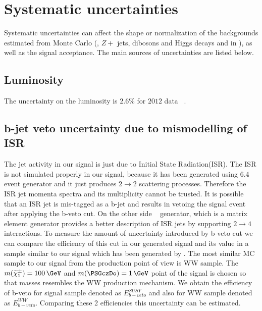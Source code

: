 \section{Systematic uncertainties}
\label{sect:sys}
Systematic uncertainties can affect the shape or normalization of the
backgrounds estimated from Monte Carlo (\ttbar, $Z+$ jets, dibosons and Higgs decays and \wjets in \tauTau \bintwo), 
as well as the signal acceptance. 
The main sources of uncertainties are listed below.
\subsection{Luminosity}
The uncertainty on the luminosity  is $2.6\%$ for $2012$ data ~\cite{LUMI}.

\subsection{b-jet veto uncertainty due to mismodelling of ISR}
The jet activity in our signal is just due to Initial State Radiation(ISR). The ISR is not simulated properly in our signal, because it has been generated using \PYTHIA $6.4$ event generator and it just produces $2 \rightarrow 2$ scattering processes. Therefore the ISR jet momenta spectra and its multiplicity cannot be trusted. It is possible that an ISR jet is mis-tagged as a b-jet and results in vetoing the signal event after applying the b-veto cut. On the other side \MADGRAPH ~\cite{MADGRAPH} generator, which is a matrix element generator provides a better description of ISR jets by supporting $2 \rightarrow 4$ interactions. To measure the amount of uncertainty introduced by b-veto cut we can compare the efficiency of this cut in our generated signal and its value in a sample similar to our signal which has been generated by \MADGRAPH. 
The most similar MC sample to our signal from the production point of view is WW sample. The $m(\chione) = 100\,\GeV$ and $m(\PSGczDo) = 1\,\GeV$ point of the signal is chosen so that masses resembles the WW production mechanism. %
We obtain the efficiency of b-veto for signal sample denoted as $E^{SUSY}_{b-veto}$ and also for WW sample denoted as $E^{WW}_{b-veto}$.
Comparing these 2 efficiencies this uncertainty can be estimated.


